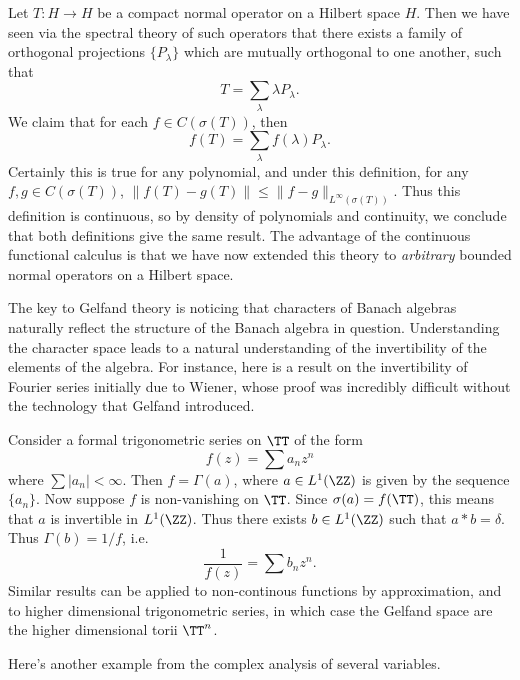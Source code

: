 \begin{example}
    Let $T: H \to H$ be a compact normal operator on a Hilbert space $H$. Then we have seen via the spectral theory of such operators that there exists a family of orthogonal projections $\{ P_\lambda \}$ which are mutually orthogonal to one another, such that
    \[ T = \sum_\lambda \lambda P_\lambda. \]
    We claim that for each $f \in C(\sigma(T))$, then
    \[ f(T) = \sum_\lambda f(\lambda) P_\lambda. \]
    Certainly this is true for any polynomial, and under this definition, for any $f,g \in C(\sigma(T))$, $\| f(T) - g(T) \| \leq \| f - g \|_{L^\infty(\sigma(T))}$. Thus this definition is continuous, so by density of polynomials and continuity, we conclude that both definitions give the same result. The advantage of the continuous functional calculus is that we have now extended this theory to \emph{arbitrary} bounded normal operators on a Hilbert space.
\end{example}

The key to Gelfand theory is noticing that characters of Banach algebras naturally reflect the structure of the Banach algebra in question. Understanding the character space leads to a natural understanding of the invertibility of the elements of the algebra. For instance, here is a result on the invertibility of Fourier series initially due to Wiener, whose proof was incredibly difficult without the technology that Gelfand introduced.

\begin{example}
    Consider a formal trigonometric series on $\TT$ of the form
    \[ f(z) = \sum a_n z^n \]
    where $\sum |a_n| < \infty$. Then $f = \Gamma(a)$, where $a \in L^1(\ZZ)$ is given by the sequence $\{ a_n \}$. Now suppose $f$ is non-vanishing on $\TT$. Since $\sigma(a) = f(\TT)$, this means that $a$ is invertible in $L^1(\ZZ)$. Thus there exists $b \in L^1(\ZZ)$ such that $a * b = \delta$. Thus $\Gamma(b) = 1/f$, i.e.
    \[ \frac{1}{f(z)} = \sum b_n z^n. \]
    Similar results can be applied to non-continous functions by approximation, and to higher dimensional trigonometric series, in which case the Gelfand space are the higher dimensional torii $\TT^n$.
\end{example}

Here's another example from the complex analysis of several variables.

